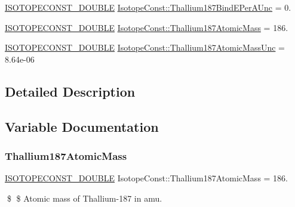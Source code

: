 \begin{DoxyCompactItemize}
\mbox{\hyperlink{group___isotope_const-_macros_ga8f45a7272ce02c0b4c65c44636ed719a}{I\+S\+O\+T\+O\+P\+E\+C\+O\+N\+S\+T\+\_\+\+D\+O\+U\+B\+LE}} \mbox{\hyperlink{group___isotope_const-_thallium-_tl187_gaebfeca40f663861eeee4c972c2beb805}{Isotope\+Const\+::\+Thallium187\+Bind\+E\+Per\+A\+Unc}} = 0.
\item 
\mbox{\hyperlink{group___isotope_const-_macros_ga8f45a7272ce02c0b4c65c44636ed719a}{I\+S\+O\+T\+O\+P\+E\+C\+O\+N\+S\+T\+\_\+\+D\+O\+U\+B\+LE}} \mbox{\hyperlink{group___isotope_const-_thallium-_tl187_ga2e6cb81e6d600d74a94d57db8cd4128e}{Isotope\+Const\+::\+Thallium187\+Atomic\+Mass}} = 186.
\item 
\mbox{\hyperlink{group___isotope_const-_macros_ga8f45a7272ce02c0b4c65c44636ed719a}{I\+S\+O\+T\+O\+P\+E\+C\+O\+N\+S\+T\+\_\+\+D\+O\+U\+B\+LE}} \mbox{\hyperlink{group___isotope_const-_thallium-_tl187_ga9fd6135e4772291f66a93cee6e625e57}{Isotope\+Const\+::\+Thallium187\+Atomic\+Mass\+Unc}} = 8.\+64e-\/06
\end{DoxyCompactItemize}


\subsection{Detailed Description}


\subsection{Variable Documentation}
\mbox{\label{group___isotope_const-_thallium-_tl187_ga2e6cb81e6d600d74a94d57db8cd4128e}} 
\subsubsection{\texorpdfstring{Thallium187\+Atomic\+Mass}{Thallium187AtomicMass}}
{\footnotesize\ttfamily \mbox{\hyperlink{group___isotope_const-_macros_ga8f45a7272ce02c0b4c65c44636ed719a}{I\+S\+O\+T\+O\+P\+E\+C\+O\+N\+S\+T\+\_\+\+D\+O\+U\+B\+LE}} Isotope\+Const\+::\+Thallium187\+Atomic\+Mass = 186.}

\$ \$ Atomic mass of Thallium-\/187 in amu. \mbox{\label{group___isotope_const-_thallium-_tl187_ga9fd6135e4772291f66a93cee6e625e57}} 
